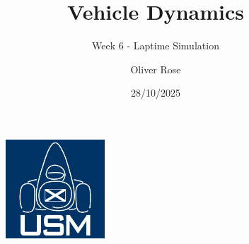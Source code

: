 \documentclass{beamer}
\title{Vehicle Dynamics}
\subtitle{Week 6 - Laptime Simulation}
\author{Oliver Rose}
\institute{University of Strathclyde Motorsport}
\date{28/10/2025}
\begin{document}
\begin{frame}
    \maketitle
\end{frame}







\begin{frame}[focus]
    \begin{figure}
        \includegraphics[width=0.33\textwidth]{../../res/usm-logo.png}
    \end{figure}
\end{frame}
\end{document}
